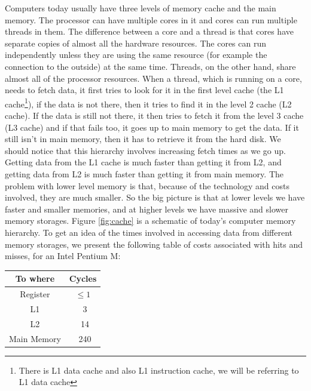 \documentclass[12pt]{diicc}
\begin{document}
Computers today usually have three levels of memory cache and the main memory. The processor can have multiple cores in it and cores can run multiple threads in them. The difference between a core and a thread is that cores have separate copies of almost all the hardware resources. The cores can run independently unless they are using the same resource (for example the connection to the outside) at the same time. Threads, on the other hand, share almost all of the processor resources. When a thread, which is running on a core, needs to fetch data, it first tries to look for it in the first level cache (the L1 cache\footnote{There is L1 data cache and also L1 instruction cache, we will be referring to L1 data cache}), if the data is not there, then it tries to find it in the level 2 cache (L2 cache). If the data is still not there, it then tries to fetch it from the level 3 cache (L3 cache) and if that fails too, it goes up to main memory to get the data. If it still isn't in main memory, then it has to retrieve it from the hard disk. We should notice that this hierarchy involves increasing fetch times as we go up. Getting data from the L1 cache is much faster than getting it from L2, and getting data from L2 is much faster than getting it from main memory. The problem with lower level memory is that, because of the technology and costs involved, they are much smaller. So the big picture is that at lower levels we have faster and smaller memories, and at higher levels we have massive and slower memory storages. Figure \ref{fig:cache} is a schematic of today's computer memory hierarchy. To get an idea of the times involved in accessing data from different memory storages, we present the following table of costs associated with hits and misses, for an Intel Pentium M:
\begin{center}
\begin{tabular}{ c | c }
  To where & Cycles \\ \hline
  Register & $\leq 1$ \\
  L1 & ~3 \\ 
  L2 & ~14 \\
  Main Memory & ~240 \\
\end{tabular}
\end{center}
\end{document}

